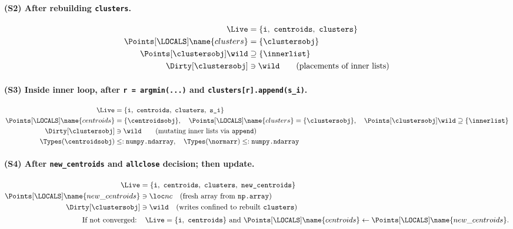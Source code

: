 \paragraph{(S2) After rebuilding \texttt{clusters}.}
\begin{align*}
\Live &= \{\texttt{i},\ \texttt{centroids},\ \texttt{clusters}\}\\
\Points[\LOCALS]\name{clusters} &= \{\clustersobj\}\\
\Points[\clustersobj]\wild &\supseteq \{\innerlist\}\\
\Dirty[\clustersobj] &\ni \wild\qquad\text{(placements of inner lists)}
\end{align*}

\paragraph{(S3) Inside inner loop, after \texttt{r = argmin(...)} and \texttt{clusters[r].append(s\_i)}.}
\begin{align*}
\Live &= \{\texttt{i},\ \texttt{centroids},\ \texttt{clusters},\ \texttt{s\_i}\}\\
\Points[\LOCALS]\name{centroids} &= \{\centroidsobj\},\quad
\Points[\LOCALS]\name{clusters} = \{\clustersobj\},\quad
\Points[\clustersobj]\wild \supseteq \{\innerlist\}\\
\Dirty[\clustersobj] &\ni \wild\qquad\text{(mutating inner lists via \texttt{append})}\\
\Types(\centroidsobj) &\le : \texttt{numpy.ndarray},\quad \Types(\normarr)\le:\texttt{numpy.ndarray}
\end{align*}

\paragraph{(S4) After \texttt{new\_centroids} and \texttt{allclose} decision; then update.}
\begin{align*}
\Live &= \{\texttt{i},\ \texttt{centroids},\ \texttt{clusters},\ \texttt{new\_centroids}\}\\
\Points[\LOCALS]\name{new\_centroids} &\ni \loc nc \quad\text{(fresh array from \texttt{np.array})}\\
\Dirty[\clustersobj] &\ni \wild\quad\text{(writes confined to rebuilt \texttt{clusters})}\\[0.25em]
\text{If not converged: }&\ \ \Live=\{\texttt{i},\ \texttt{centroids}\}\ \text{and}\
\Points[\LOCALS]\name{centroids} \leftarrow \Points[\LOCALS]\name{new\_centroids}.
\end{align*}

